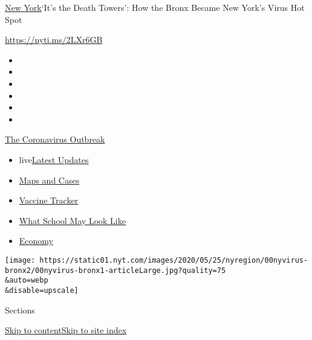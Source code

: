 \href{/section/nyregion}{New York}\textbar{}`It's the Death Towers': How
the Bronx Became New York's Virus Hot Spot

\url{https://nyti.ms/2LXr6GB}

\begin{itemize}
\item
\item
\item
\item
\item
\item
\end{itemize}

\href{https://www.nytimes.com/news-event/coronavirus?action=click\&pgtype=Article\&state=default\&region=TOP_BANNER\&context=storylines_menu}{The
Coronavirus Outbreak}

\begin{itemize}
\tightlist
\item
  live\href{https://www.nytimes.com/2020/08/02/world/coronavirus-updates.html?action=click\&pgtype=Article\&state=default\&region=TOP_BANNER\&context=storylines_menu}{Latest
  Updates}
\item
  \href{https://www.nytimes.com/interactive/2020/us/coronavirus-us-cases.html?action=click\&pgtype=Article\&state=default\&region=TOP_BANNER\&context=storylines_menu}{Maps
  and Cases}
\item
  \href{https://www.nytimes.com/interactive/2020/science/coronavirus-vaccine-tracker.html?action=click\&pgtype=Article\&state=default\&region=TOP_BANNER\&context=storylines_menu}{Vaccine
  Tracker}
\item
  \href{https://www.nytimes.com/interactive/2020/07/29/us/schools-reopening-coronavirus.html?action=click\&pgtype=Article\&state=default\&region=TOP_BANNER\&context=storylines_menu}{What
  School May Look Like}
\item
  \href{https://www.nytimes.com/live/2020/07/31/business/stock-market-today-coronavirus?action=click\&pgtype=Article\&state=default\&region=TOP_BANNER\&context=storylines_menu}{Economy}
\end{itemize}

\texttt{[image: https://static01.nyt.com/images/2020/05/25/nyregion/00nyvirus-bronx2/00nyvirus-bronx1-articleLarge.jpg?quality=75\\\&auto=webp\\\&disable=upscale]}

Sections

\protect\hyperlink{site-content}{Skip to
content}\protect\hyperlink{site-index}{Skip to site index}

